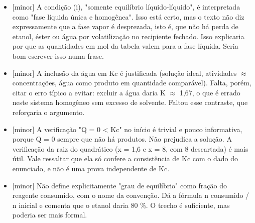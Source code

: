 \documentclass{article}%
\begin{document}
\begin{itemize}%
\item%
{[}minor{]} A condição (i), "somente equilíbrio líquido{-}líquido", é interpretada como "fase líquida única e homogênea". Isso está certo, mas o texto não diz expressamente que a fase vapor é desprezada, isto é, que não há perda de etanol, éster ou água por volatilização no recipiente fechado. Isso explicaria por que as quantidades em mol da tabela valem para a fase líquida. Seria bom escrever isso numa frase.%
\item%
{[}minor{]} A inclusão da água em Kc é justificada (solução ideal, atividades $\approx$ concentrações, água como produto em quantidade comparável). Falta, porém, citar o erro típico a evitar: excluir a água daria K $\approx$ 1,67, o que é errado neste sistema homogêneo sem excesso de solvente. Faltou esse contraste, que reforçaria o argumento.%
\item%
{[}minor{]} A verificação "Q = 0 < Kc" no início é trivial e pouco informativa, porque Q = 0 sempre que não há produtos. Não prejudica a solução. A verificação da raiz do quadrático (x = 1,6 e x = 8, com 8 descartada) é mais útil. Vale ressaltar que ela só confere a consistência de Kc com o dado do enunciado, e não é uma prova independente de Kc.%
\item%
{[}minor{]} Não define explicitamente "grau de equilíbrio" como fração do reagente consumido, com o nome da convenção. Dá a fórmula n consumido / n inicial e comenta que o etanol daria 80 \%. O trecho é suficiente, mas poderia ser mais formal.%
\end{itemize}%
\end{document}
